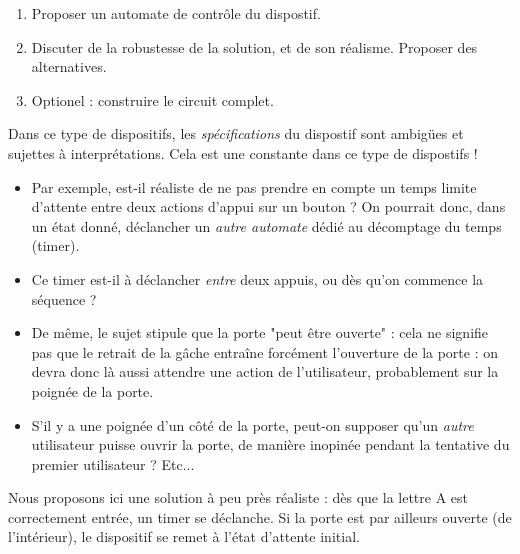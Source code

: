 \documentclass[a4paper,11pt]{article}
\begin{document}
\begin{enumerate}
  \item Proposer un automate de contrôle du dispostif.
  \item Discuter de la robustesse de la solution, et de son réalisme. Proposer des alternatives.
  \item Optionel : construire le circuit complet.
\end{enumerate}

Dans ce type de dispositifs, les {\it spécifications} du dispostif sont ambigües et sujettes
à interprétations. Cela est une constante dans ce type de dispostifs !
\begin{itemize}
  \item Par exemple, est-il réaliste de ne pas prendre en compte un temps limite d'attente entre deux actions d'appui sur
  un bouton ? On pourrait donc, dans un état donné, déclancher un {\it autre automate} dédié au décomptage du temps (timer).
  \item Ce timer est-il à déclancher {\it entre} deux appuis, ou dès qu'on commence la séquence ?
  \item De même, le sujet stipule que la porte "peut être ouverte" : cela ne signifie pas que le retrait de la gâche
  entraîne forcément l'ouverture de la porte : on devra donc là aussi attendre une action de l'utilisateur,
  probablement sur la poignée de la porte.
  \item S'il y a une poignée d'un côté de la porte, peut-on supposer qu'un {\it autre} utilisateur puisse
  ouvrir la porte, de manière inopinée pendant la tentative du premier utilisateur ? Etc...
\end{itemize}

Nous proposons ici une solution à peu près réaliste : dès que la lettre A est correctement entrée, un timer se déclanche.
Si la porte est par ailleurs ouverte (de l'intérieur), le dispositif se remet à l'état d'attente initial.
\end{document}
